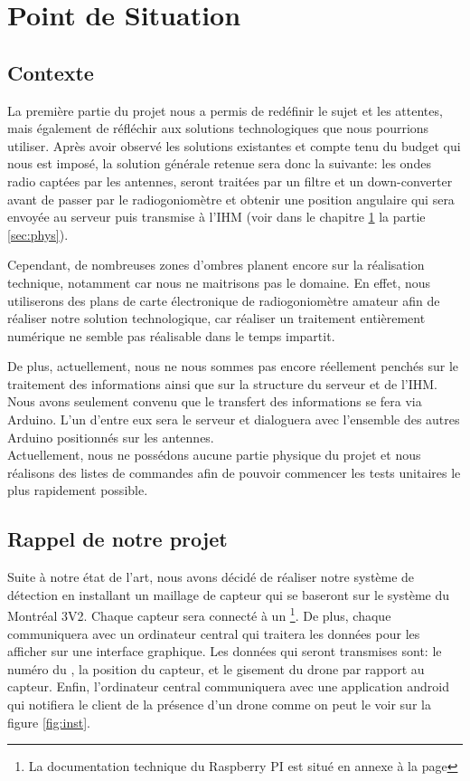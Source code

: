 
\chapter{Point de Situation}
\label{chap:choix}

\section{Contexte}
La première partie du projet nous a permis de redéfinir le sujet et les attentes, mais également de réfléchir aux solutions technologiques que nous pourrions utiliser. Après avoir observé les solutions existantes et compte tenu du budget qui nous est imposé, la solution générale retenue sera donc la suivante: les ondes radio captées par les antennes, seront traitées par un filtre et un down-converter avant de passer par le radiogoniomètre et obtenir une position angulaire qui sera envoyée au serveur puis transmise à l’IHM (voir dans le chapitre \ref{chap:choix} la partie \ref{sec:phys}).

Cependant, de nombreuses zones d’ombres planent encore sur la réalisation technique, notamment car nous ne maitrisons pas le domaine. En effet, nous utiliserons des plans de carte électronique de radiogoniomètre amateur afin de réaliser notre solution technologique, car réaliser un traitement entièrement numérique ne semble pas réalisable dans le temps impartit. 

De plus, actuellement, nous ne nous sommes pas encore réellement penchés sur le traitement des informations ainsi que sur la structure du serveur et de l’IHM. Nous avons seulement convenu que le transfert des informations se fera via Arduino. L’un d’entre eux sera le serveur et dialoguera avec l’ensemble des autres Arduino positionnés sur les antennes.~\\


Actuellement, nous ne possédons aucune partie physique du projet et nous réalisons des listes de commandes afin de pouvoir commencer les tests unitaires le plus rapidement possible.

\section{Rappel de notre projet}

Suite à notre état de l'art, nous avons décidé de réaliser notre système de détection en installant un maillage de capteur qui se baseront sur le système du Montréal 3V2. Chaque capteur sera connecté à un  \footnote{La documentation technique du Raspberry PI est situé en annexe à la page \pageref{annexe:rpi}}. De plus, chaque \rpi communiquera avec un ordinateur central qui traitera les données pour les afficher sur une interface graphique. Les données qui seront transmises sont: le numéro du \rpi, la position du capteur, et le gisement du drone par rapport au capteur. Enfin, l'ordinateur central communiquera avec une application android qui notifiera le client de la présence d'un drone comme on peut le voir sur la figure \ref{fig:inst}.
~\\

